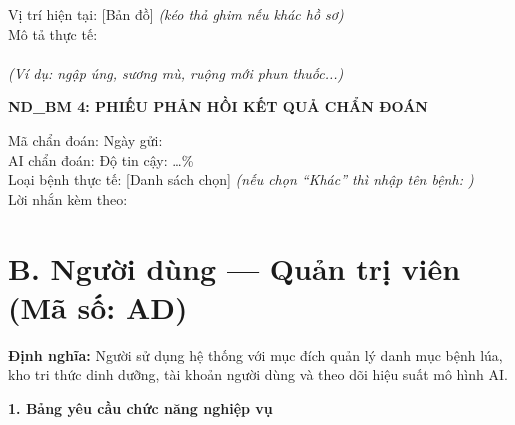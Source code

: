 ﻿\documentclass[12pt,a4paper]{article}
\begin{document}
\noindent Vị trí hiện tại: [Bản đồ] \textit{(kéo thả ghim nếu khác hồ sơ)} \\
Mô tả thực tế: \dotfill \\
\dotfill \\
\textit{(Ví dụ: ngập úng, sương mù, ruộng mới phun thuốc...)}

\vspace{0.3cm}
\noindent\textbf{ND\_BM 4: PHIẾU PHẢN HỒI KẾT QUẢ CHẨN ĐOÁN}

\noindent Mã chẩn đoán: \dotfill \quad Ngày gửi: \dotfill \\
AI chẩn đoán: \dotfill \quad Độ tin cậy: \dots\% \\
Loại bệnh thực tế: [Danh sách chọn] \textit{(nếu chọn ``Khác'' thì nhập tên bệnh: \dotfill)} \\
Lời nhắn kèm theo: \dotfill \\
\dotfill

\section*{B. Người dùng --- Quản trị viên (Mã số: AD)}

\textbf{Định nghĩa:} Người sử dụng hệ thống với mục đích quản lý danh mục bệnh lúa, kho tri thức dinh dưỡng, tài khoản người dùng và theo dõi hiệu suất mô hình AI.

\vspace{0.3cm}
\textbf{1. Bảng yêu cầu chức năng nghiệp vụ}
\end{document}
